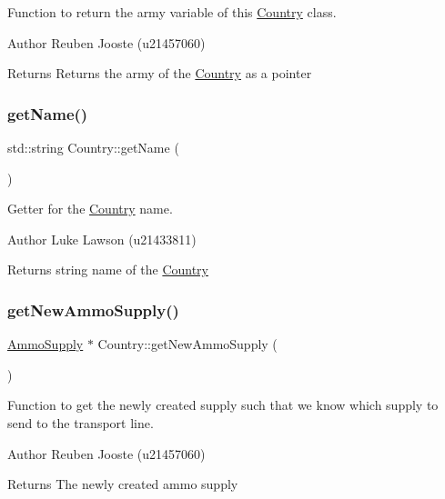 Function to return the army variable of this \mbox{\hyperlink{class_country}{Country}} class. 

\begin{DoxyAuthor}{Author}
Reuben Jooste (u21457060) 
\end{DoxyAuthor}
\begin{DoxyReturn}{Returns}
Returns the army of the \mbox{\hyperlink{class_country}{Country}} as a pointer 
\end{DoxyReturn}
\mbox{\label{class_country_aa584ff75674728736d4952b32693501a}} 
\subsubsection{\texorpdfstring{getName()}{getName()}}
{\footnotesize\ttfamily std\+::string Country\+::get\+Name (\begin{DoxyParamCaption}{ }\end{DoxyParamCaption})}



Getter for the \mbox{\hyperlink{class_country}{Country}} name. 

\begin{DoxyAuthor}{Author}
Luke Lawson (u21433811) 
\end{DoxyAuthor}
\begin{DoxyReturn}{Returns}
string name of the \mbox{\hyperlink{class_country}{Country}} 
\end{DoxyReturn}
\mbox{\label{class_country_a959665cddc5e2cbadaae9736f376cf23}} 
\subsubsection{\texorpdfstring{getNewAmmoSupply()}{getNewAmmoSupply()}}
{\footnotesize\ttfamily \mbox{\hyperlink{class_ammo_supply}{Ammo\+Supply}} $\ast$ Country\+::get\+New\+Ammo\+Supply (\begin{DoxyParamCaption}{ }\end{DoxyParamCaption})}



Function to get the newly created supply such that we know which supply to send to the transport line. 

\begin{DoxyAuthor}{Author}
Reuben Jooste (u21457060) 
\end{DoxyAuthor}
\begin{DoxyReturn}{Returns}
The newly created ammo supply 
\end{DoxyReturn}
\mbox{\label{class_country_a1b51d2e6356a8368dd6ee7cbc21db0e4}} 
